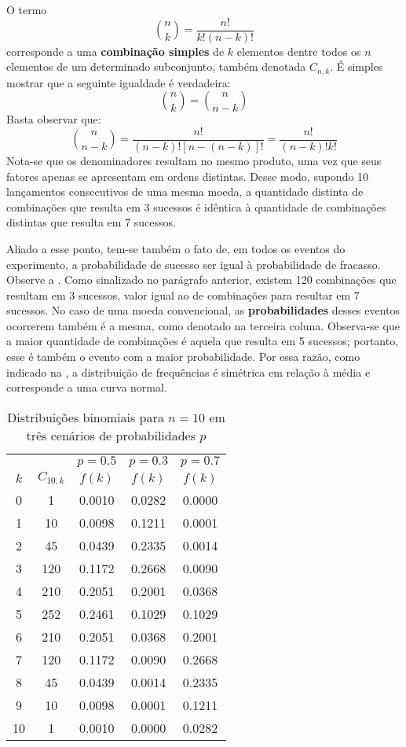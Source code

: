 O termo
\[
    \binom{n}{k} = \frac{n!}{k!(n-k)!}
\]
corresponde a uma \textbf{combinação simples} de $k$ elementos dentre todos os
$n$ elementos de um determinado subconjunto, também denotada $C_{n,k}$. É
simples mostrar que a seguinte igualdade é verdadeira:
 \[
    \binom{n}{k} = \binom{n}{n-k}
\]
Basta observar que:
\[
    \binom{n}{n-k} = \frac{n!}{(n-k)![n-(n-k)]!} = \frac{n!}{(n-k)!k!}
\]
Nota-se que os denominadores resultam no mesmo produto, uma vez que seus
fatores apenas se apresentam em ordens distintas. Desse modo, supondo 10
lançamentos consecutivos de uma mesma moeda, a quantidade distinta de
combinações que resulta em 3 sucessos é idêntica à quantidade de combinações
distintas que resulta em 7 sucessos.

Aliado a esse ponto, tem-se também o fato de, em todos os eventos do
experimento, a probabilidade de sucesso ser igual à probabilidade de fracasso.
Observe a . Como sinalizado no parágrafo anterior,
existem 120 combinações que resultam em 3 sucessos, valor igual ao de
combinações para resultar em 7 sucessos. No caso de uma moeda convencional, as
\textbf{probabilidades} desses eventos ocorrerem também é a mesma, como
denotado na terceira coluna. Observa-se que a maior quantidade de combinações é
aquela que resulta em 5 sucessos; portanto, esse é também o evento com a maior
probabilidade. Por essa razão, como indicado na , a
distribuição de frequências é simétrica em relação à média e corresponde a uma
curva normal.

\begin{table}[htpb]
    \centering
    \begin{tabular}{ccccc}
        \toprule
            &           & $p=0.5$ & $p=0.3$ & $p=0.7$ \\
            \cmidrule(lr){3-3} \cmidrule(lr){4-4} \cmidrule(lr){5-5}
        $k$ & $C_{10,k}$ & $f(k)$  & $f(k)$  & $f(k)$ \\
        \midrule
        0   & 1         & 0.0010  & 0.0282  & 0.0000 \\
        1   & 10        & 0.0098  & 0.1211  & 0.0001 \\
        2   & 45        & 0.0439  & 0.2335  & 0.0014 \\
        3   & 120       & 0.1172  & 0.2668  & 0.0090 \\
        4   & 210       & 0.2051  & 0.2001  & 0.0368 \\
        5   & 252       & 0.2461  & 0.1029  & 0.1029 \\
        6   & 210       & 0.2051  & 0.0368  & 0.2001 \\
        7   & 120       & 0.1172  & 0.0090  & 0.2668 \\
        8   & 45        & 0.0439  & 0.0014  & 0.2335 \\
        9   & 10        & 0.0098  & 0.0001  & 0.1211 \\
        10  & 1         & 0.0010  & 0.0000  & 0.0282 \\
        \bottomrule
    \end{tabular}
    \caption{Distribuições binomiais para $n=10$ em três cenários de
    probabilidades $p$}
    \label{tab:dez-lancamentos}
\end{table}

